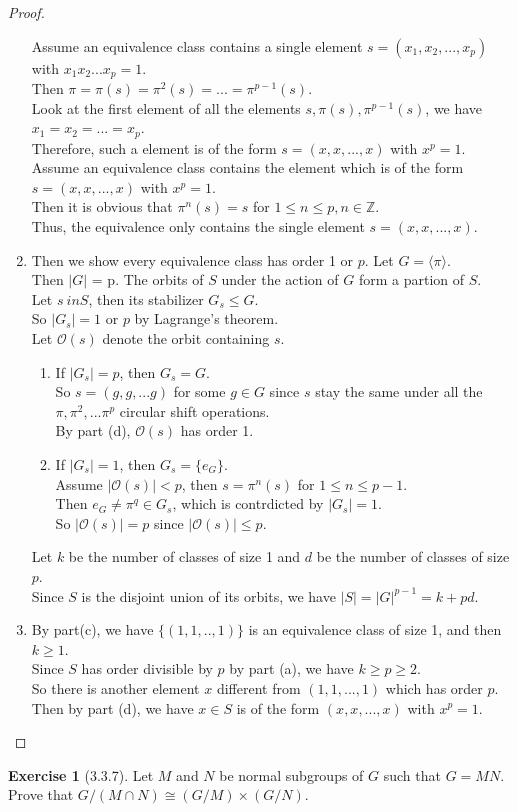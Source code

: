 \documentclass[14pt]{amsart}
\newcommand{\llo}{\mathcal{O}}
\newcommand{\bbz}{\mathbb{Z}}
\theoremstyle{plain}
\theoremstyle{definition}
\newtheorem{exer}[lem]{Exercise}
\begin{document}
\begin{proof}
\begin{enumerate}
	  Assume an equivalence class contains a single element $s=(x_1,x_2,...,x_p)$ with $x_1x_2...x_p=1$.\\
	  Then $\pi= \pi(s) = \pi^2(s) = ...=\pi^{p-1}(s)$.\\
	  Look at the first element of all the elements $s,\pi(s),\pi^{p-1}(s)$, we have $x_1=x_2=...=x_p$.\\
	  Therefore, such a element is of the form $s=(x,x,...,x)$ with $x^p = 1$.\\
	  Assume an equivalence class contains the element which is of the form $s=(x,x,...,x)$ with $x^p=1$.\\
	  Then it is obvious that $\pi^n(s) = s$ for $1 \leq n \leq p, n\in \bbz$.\\
	  Thus, the equivalence only contains the single element $s = (x,x,...,x)$.
	\item
	   Then we show every equivalence class has order 1 or $p$.
		Let $G = \langle \pi \rangle$.\\
		Then $|G|$ = p.
	  	The orbits of $S$ under the action of $G$ form a partion of $S$.\\
	  	Let $s\ in S$, then its stabilizer $G_s \leq G$.\\
	  	So $|G_s| = 1$ or $p$ by Lagrange’s theorem.\\
	  	Let $\llo(s)$ denote the orbit containing $s$.
	  	\begin{enumerate}
	  		\item
	  		  If $|G_s|= p$, then $G_s = G$. \\
	  		  So $s = (g,g,...g)$ for some $g \in G$ since $s$ stay the same under all the $\pi,\pi^2,...\pi^p$ circular shift operations.\\
	  		  By part (d), $\llo(s)$ has order 1.
	  		  \item
	  		  	If $|G_s|= 1$, then $G_s = \{e_G\}$. \\
	  		  	Assume $|\llo(s)| < p$, then $s = \pi^n(s)$ for $1 \leq n \leq p-1$.\\
	  		  	Then $e_G \neq \pi^q \in G_s$, which is contrdicted by $|G_s| = 1$.\\
	  		  	So $|\llo(s)| = p$ since $|\llo(s)| \leq p$.
		\end{enumerate}
	 Let $k$ be the number of classes of size 1 and $d$ be the number of classes of size $p$.\\
	 Since $S$ is the disjoint union of its orbits, we have $|S| = |G|^{p-1} = k+pd$.
	\item 
	By part(c), we have $\{(1,1,..,1)\}$ is an equivalence class of size 1, and then $k \geq 1$.\\
	Since $S$ has order divisible by $p$ by part (a), we have $k \geq p \geq 2$.\\
	So there is another element $x$ different from $(1,1,...,1)$ which has order $p$.\\
	Then by part (d), we have $x\in S$ is of the form $(x,x,...,x)$ with $x^p = 1$.
  \end{enumerate}
\end{proof}

\begin{exer}[3.3.7]
Let $M$ and $N$ be normal subgroups of $G$ such that $G=MN$. Prove that $G/(M\cap N)\cong (G/M)\times(G/N)$. 
\end{exer}
\end{document}
